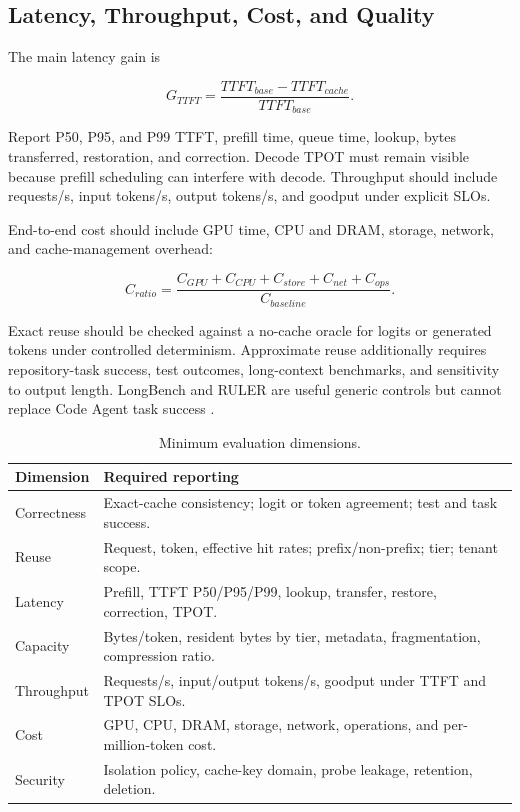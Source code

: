 \documentclass[conference,10pt]{IEEEtran}
\newcommand{\ttft}{TTFT\xspace}
\newcommand{\tpot}{TPOT\xspace}
\begin{document}
\subsection{Latency, Throughput, Cost, and Quality}

The main latency gain is

\begin{equation}
G_{TTFT}=\frac{TTFT_{base}-TTFT_{cache}}{TTFT_{base}}.
\label{eq:ttft}
\end{equation}

Report P50, P95, and P99 \ttft, prefill time, queue time, lookup, bytes transferred, restoration, and correction. Decode \tpot must remain visible because prefill scheduling can interfere with decode. Throughput should include requests/s, input tokens/s, output tokens/s, and goodput under explicit SLOs.

End-to-end cost should include GPU time, CPU and DRAM, storage, network, and cache-management overhead:

\begin{equation}
C_{ratio}=\frac{C_{GPU}+C_{CPU}+C_{store}+C_{net}+C_{ops}}
{C_{baseline}}.
\label{eq:cost}
\end{equation}

Exact reuse should be checked against a no-cache oracle for logits or generated tokens under controlled determinism. Approximate reuse additionally requires repository-task success, test outcomes, long-context benchmarks, and sensitivity to output length. LongBench and RULER are useful generic controls but cannot replace Code Agent task success \cite{bai2023longbench,hsieh2024ruler}.

\begin{table}[t]
\caption{Minimum evaluation dimensions.}
\label{tab:metrics}
\centering
\small
\begin{tabularx}{\columnwidth}{p{}Y}
\toprule
Dimension & Required reporting \\
\midrule
Correctness & Exact-cache consistency; logit or token agreement; test and task success. \\
Reuse & Request, token, effective hit rates; prefix/non-prefix; tier; tenant scope. \\
Latency & Prefill, \ttft P50/P95/P99, lookup, transfer, restore, correction, \tpot. \\
Capacity & Bytes/token, resident bytes by tier, metadata, fragmentation, compression ratio. \\
Throughput & Requests/s, input/output tokens/s, goodput under \ttft and \tpot SLOs. \\
Cost & GPU, CPU, DRAM, storage, network, operations, and per-million-token cost. \\
Security & Isolation policy, cache-key domain, probe leakage, retention, deletion. \\
\bottomrule
\end{tabularx}
\end{table}
\end{document}
